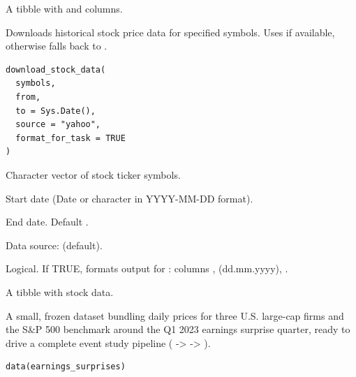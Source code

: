 \documentclass[a4paper]{book}
\begin{document}
%
\begin{Value}
A tibble with  and  columns.
\end{Value}
%
\begin{Description}
Downloads historical stock price data for specified symbols. Uses
 if available, otherwise falls back to .
\end{Description}
%
\begin{Usage}
\begin{verbatim}
download_stock_data(
  symbols,
  from,
  to = Sys.Date(),
  source = "yahoo",
  format_for_task = TRUE
)
\end{verbatim}
\end{Usage}
%
\begin{Arguments}
\begin{ldescription}
\item[\code{symbols}] Character vector of stock ticker symbols.

\item[\code{from}] Start date (Date or character in YYYY-MM-DD format).

\item[\code{to}] End date. Default .

\item[\code{source}] Data source:  (default).

\item[\code{format\_for\_task}] Logical. If TRUE, formats output for
: columns ,  (dd.mm.yyyy),
.
\end{ldescription}
\end{Arguments}
%
\begin{Value}
A tibble with stock data.
\end{Value}
%
\begin{Description}
A small, frozen dataset bundling daily prices for three U.S. large-cap firms
and the S\&P 500 benchmark around the Q1 2023 earnings surprise quarter,
ready to drive a complete event study pipeline (
->  -> ).
\end{Description}
%
\begin{Usage}
\begin{verbatim}
data(earnings_surprises)
\end{verbatim}
\end{Usage}
\end{document}
